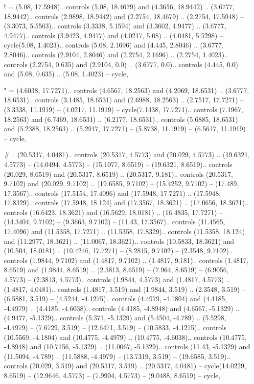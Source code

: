 ! = {(5.08, 17.5948).. controls (5.08, 18.4679) and (4.3656, 18.9442) .. (3.6777, 18.9442).. controls (2.9898, 18.9442) and (2.2754, 18.4679) .. (2.2754, 17.5948) -- (3.3073, 5.5563).. controls (3.3338, 5.1594) and (3.3602, 4.9477) .. (3.6777, 4.9477).. controls (3.9423, 4.9477) and (4.0217, 5.08) .. (4.0481, 5.5298) -- cycle(5.08, 1.4023).. controls (5.08, 2.1696) and (4.445, 2.8046) .. (3.6777, 2.8046).. controls (2.9104, 2.8046) and (2.2754, 2.1696) .. (2.2754, 1.4023).. controls (2.2754, 0.635) and (2.9104, 0.0) .. (3.6777, 0.0).. controls (4.445, 0.0) and (5.08, 0.635) .. (5.08, 1.4023) -- cycle},

" = {(4.6038, 17.7271).. controls (4.6567, 18.2563) and (4.2069, 18.6531) .. (3.6777, 18.6531).. controls (3.1485, 18.6531) and (2.6988, 18.2563) .. (2.7517, 17.7271) -- (3.3338, 11.1919) -- (4.0217, 11.1919) -- cycle(7.1438, 17.7271).. controls (7.1967, 18.2563) and (6.7469, 18.6531) .. (6.2177, 18.6531).. controls (5.6885, 18.6531) and (5.2388, 18.2563) .. (5.2917, 17.7271) -- (5.8738, 11.1919) -- (6.5617, 11.1919) -- cycle},

\#= {(20.5317, 4.0481).. controls (20.5317, 4.5773) and (20.029, 4.5773) .. (19.6321, 4.5773) -- (14.0494, 4.5773) -- (15.1077, 8.6519) -- (19.6321, 8.6519).. controls (20.029, 8.6519) and (20.5317, 8.6519) .. (20.5317, 9.181).. controls (20.5317, 9.7102) and (20.029, 9.7102) .. (19.6585, 9.7102) -- (15.4252, 9.7102) -- (17.489, 17.3567).. controls (17.5154, 17.4096) and (17.5948, 17.7271) .. (17.5948, 17.8329).. controls (17.5948, 18.124) and (17.3567, 18.3621) .. (17.0656, 18.3621).. controls (16.6423, 18.3621) and (16.5629, 18.0181) .. (16.4835, 17.7271) -- (14.3404, 9.7102) -- (9.3663, 9.7102) -- (11.43, 17.3567).. controls (11.4565, 17.4096) and (11.5358, 17.7271) .. (11.5358, 17.8329).. controls (11.5358, 18.124) and (11.2977, 18.3621) .. (11.0067, 18.3621).. controls (10.5833, 18.3621) and (10.504, 18.0181) .. (10.4246, 17.7271) -- (8.2815, 9.7102) -- (2.3548, 9.7102).. controls (1.9844, 9.7102) and (1.4817, 9.7102) .. (1.4817, 9.181).. controls (1.4817, 8.6519) and (1.9844, 8.6519) .. (2.3813, 8.6519) -- (7.964, 8.6519) -- (6.9056, 4.5773) -- (2.3813, 4.5773).. controls (1.9844, 4.5773) and (1.4817, 4.5773) .. (1.4817, 4.0481).. controls (1.4817, 3.519) and (1.9844, 3.519) .. (2.3548, 3.519) -- (6.5881, 3.519) -- (4.5244, -4.1275).. controls (4.4979, -4.1804) and (4.4185, -4.4979) .. (4.4185, -4.6038).. controls (4.4185, -4.8948) and (4.6567, -5.1329) .. (4.9477, -5.1329).. controls (5.371, -5.1329) and (5.4504, -4.789) .. (5.5298, -4.4979) -- (7.6729, 3.519) -- (12.6471, 3.519) -- (10.5833, -4.1275).. controls (10.5569, -4.1804) and (10.4775, -4.4979) .. (10.4775, -4.6038).. controls (10.4775, -4.8948) and (10.7156, -5.1329) .. (11.0067, -5.1329).. controls (11.43, -5.1329) and (11.5094, -4.789) .. (11.5888, -4.4979) -- (13.7319, 3.519) -- (19.6585, 3.519).. controls (20.029, 3.519) and (20.5317, 3.519) .. (20.5317, 4.0481) -- cycle(14.0229, 8.6519) -- (12.9646, 4.5773) -- (7.9904, 4.5773) -- (9.0488, 8.6519) -- cycle},

